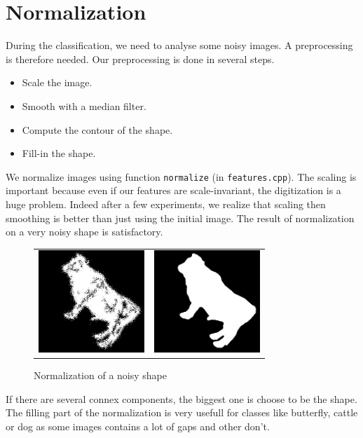 \documentclass[a4paper, 11pt]{article}
\begin{document}
\newpage
\section{Normalization}

During the classification, we need to analyse some noisy images. A preprocessing is therefore needed. Our preprocessing is done in several steps.
\begin{itemize}
  \item Scale the image.
  \item Smooth with a median filter.
	\item Compute the contour of the shape.
	\item Fill-in the shape.
\end{itemize}

\noindent We normalize images using function \verb|normalize| (in \verb|features.cpp|).
The scaling is important because even if our features are scale-invariant, the digitization is a huge problem. Indeed after a few experiments, we realize that scaling then smoothing is better than just using the initial image. The result of normalization on a very noisy shape is satisfactory. 

\begin{figure}[h!]
\centering
\begin{tabular}{ll}
\includegraphics[width=4cm]{normalize-noisy-1.png} &
\includegraphics[width=4cm]{normalize-noisy-2.png} \\
\end{tabular}
\caption{Normalization of a noisy shape}
\end{figure}
 
\noindent If there are several connex components, the biggest one is choose to be the shape. The filling part of the normalization is very usefull for classes like butterfly, cattle or dog as some images contains a lot of gaps and other don't.
\end{document}
